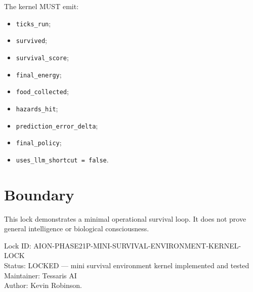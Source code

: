 \documentclass[11pt,a4paper]{article}
\begin{document}
The kernel MUST emit:

\begin{itemize}
  \item \texttt{ticks\_run};
  \item \texttt{survived};
  \item \texttt{survival\_score};
  \item \texttt{final\_energy};
  \item \texttt{food\_collected};
  \item \texttt{hazards\_hit};
  \item \texttt{prediction\_error\_delta};
  \item \texttt{final\_policy};
  \item \texttt{uses\_llm\_shortcut = false}.
\end{itemize}

\section{Boundary}

This lock demonstrates a minimal operational survival loop. It does not prove general intelligence or biological consciousness.

\bigskip

\noindent
Lock ID: AION-PHASE21P-MINI-SURVIVAL-ENVIRONMENT-KERNEL-LOCK\\
Status: LOCKED --- mini survival environment kernel implemented and tested\\
Maintainer: Tessaris AI\\
Author: Kevin Robinson.
\end{document}
